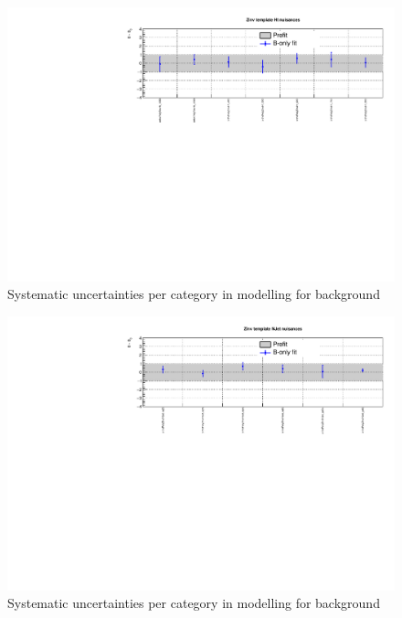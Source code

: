 \clearpage
\begin{figure}[h!]
  \centering
  \caption{Systematic uncertainties per \scalht category in \mht modelling for \znunuj background}
  \includegraphics[width=1.\linewidth]{figures/results/36invfb_approval/postfit/nuis/TemplateZinv_ht_nuisances}
\end{figure}

\begin{figure}[h!]
  \centering
  \caption{Systematic uncertainties per \njet category in \mht modelling for \znunuj background}
  \includegraphics[width=1.\linewidth]{figures/results/36invfb_approval/postfit/nuis/TemplateZinv_njet_nuisances}
\end{figure}


